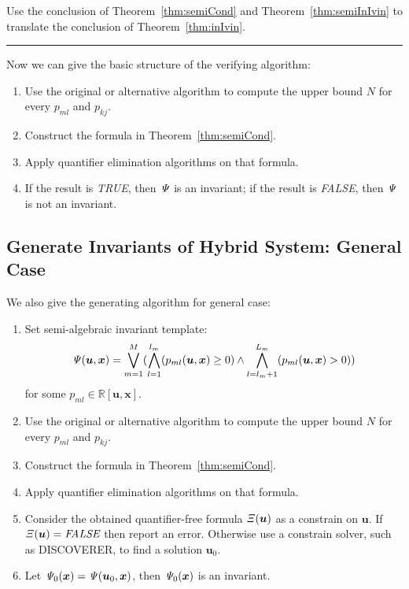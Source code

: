 \documentclass{jssc}
\newcommand{\rulex}{\hfill\rule{1mm}{3mm}}
\begin{document}
\proof
Use the conclusion of Theorem~\ref{thm:semiCond} and Theorem~\ref{thm:semiInIvin} to translate the conclusion of Theorem~\ref{thm:inIvin}.
\rulex \newline

Now we can give the basic structure of the verifying algorithm:
\begin{enumerate}
	\item Use the original or alternative algorithm to compute the upper bound $N$ for every $p_{ml}$ and $p_{kj}$.
	\item Construct the formula in Theorem~\ref{thm:semiCond}.
	\item Apply quantifier elimination algorithms on that formula.
	\item If the result is \emph{TRUE}, then ${\it \Psi}$ is an invariant; if the result is \emph{FALSE}, then ${\it \Psi}$ is not an invariant.
\end{enumerate}

\subsection{Generate Invariants of Hybrid System: General Case}
We also give the generating algorithm for general case:
\begin{enumerate}
	\item Set semi-algebraic invariant template:
		\begin{equation*}
			{\it \Psi}(\boldsymbol{u}, \boldsymbol{x}) = \bigvee_{m=1}^M (\bigwedge_{l=1}^{l_m} (p_{ml}(\boldsymbol{u}, \boldsymbol{x})\geq 0) \wedge \bigwedge_{l=l_m+1}^{L_m} (p_{ml}(\boldsymbol{u}, \boldsymbol{x}) > 0))
		\end{equation*}
		for some $p_{ml} \in \mathbb{R}[\boldsymbol{u}, \boldsymbol{x}]$.
	\item Use the original or alternative algorithm to compute the upper bound $N$ for every $p_{ml}$ and $p_{kj}$.
	\item Construct the formula in Theorem~\ref{thm:semiCond}.
	\item Apply quantifier elimination algorithms on that formula.
	\item Consider the obtained quantifier-free formula ${\it \Xi}(\boldsymbol{u})$ as a constrain on $\boldsymbol{u}$. If ${\it \Xi}(\boldsymbol{u}) = \textit{FALSE}$ then report an error. Otherwise use a constrain solver, such as DISCOVERER\cite{xia2007discoverer}, to find a solution $\boldsymbol{u}_0$.
	\item Let ${\it \Psi}_0(\boldsymbol{x}) = {\it \Psi}(\boldsymbol{u}_0, \boldsymbol{x})$, then ${\it \Psi}_0(\boldsymbol{x})$ is an invariant.
\end{enumerate}
\end{document}
